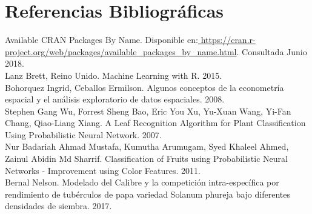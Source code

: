 
\chapter*{Referencias Bibliográficas}

\noindent
Available CRAN Packages By Name. Disponible en:\url{ https://cran.r-project.org/web/packages/available_packages_by_name.html}. Consultada Junio 2018.\\

\noindent
Lanz Brett, Reino Unido. Machine Learning with R. 2015. \\

\noindent
Bohorquez Ingrid, Ceballos Ermilson. Algunos conceptos de la econometría espacial y el análisis exploratorio de datos espaciales. 2008.\\

\noindent
Stephen Gang Wu, Forrest Sheng Bao, Eric You Xu, Yu-Xuan Wang, Yi-Fan Chang, Qiao-Liang Xiang. A Leaf Recognition Algorithm for Plant Classification Using Probabilistic Neural Network. 2007.\\

\noindent
Nur Badariah Ahmad Mustafa, Kumutha Arumugam, Syed Khaleel Ahmed, Zainul Abidin Md Sharrif. Classification of Fruits using Probabilistic Neural Networks - Improvement using Color Features. 2011.\\

\noindent
Bernal Nelson. Modelado del Calibre y la competición intra-específica por rendimiento de tubérculos de papa variedad Solanum phureja bajo diferentes densidades de siembra. 2017.\\

